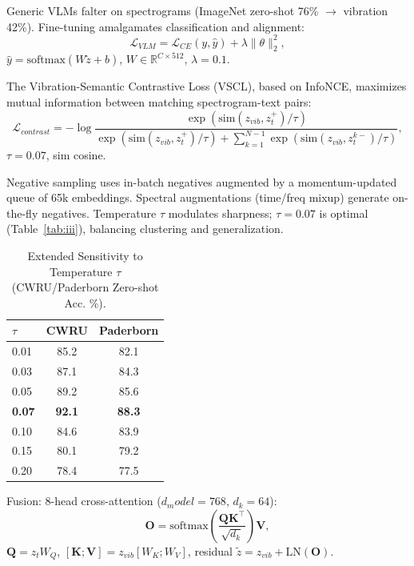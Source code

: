 Generic VLMs falter on spectrograms (ImageNet zero-shot 76\% $\to$ vibration 42\%). Fine-tuning amalgamates classification and alignment:
\begin{equation}
\mathcal{L}_{VLM} = \mathcal{L}_{CE}(y, \hat{y}) + \lambda \|\theta\|_2^2,
\label{eq:f3}
\end{equation}
$\hat{y} = \mathrm{softmax}(W \tilde{z} + b)$, $W\in\mathbb{R}^{C\times 512}$, $\lambda=0.1$.

The Vibration-Semantic Contrastive Loss (VSCL), based on InfoNCE, maximizes mutual information between matching spectrogram-text pairs:
\begin{equation}
\mathcal{L}_{contrast} = -\log \frac{\exp(\mathrm{sim}(z_{vib}, z_t^+)/\tau)}{\exp(\mathrm{sim}(z_{vib}, z_t^+)/\tau) + \sum_{k=1}^{N-1} \exp(\mathrm{sim}(z_{vib}, z_t^{k-})/\tau)},
\label{eq:f4}
\end{equation}
$\tau=0.07$, sim cosine. 

Negative sampling uses in-batch negatives augmented by a momentum-updated queue of 65k embeddings. Spectral augmentations (time/freq mixup) generate on-the-fly negatives. Temperature $\tau$ modulates sharpness; $\tau=0.07$ is optimal (Table~\ref{tab:iii}), balancing clustering and generalization.

\begin{table}[t]
\centering
\caption{Extended Sensitivity to Temperature $\tau$ (CWRU/Paderborn Zero-shot Acc. \%).}
\label{tab:tau_extended}
\begin{tabular}{@{}lcc@{}}
\toprule
$\tau$ & CWRU & Paderborn \\
\midrule
0.01 & 85.2 & 82.1 \\
0.03 & 87.1 & 84.3 \\
0.05 & 89.2 & 85.6 \\
\textbf{0.07} & \textbf{92.1} & \textbf{88.3} \\
0.10 & 84.6 & 83.9 \\
0.15 & 80.1 & 79.2 \\
0.20 & 78.4 & 77.5 \\
\bottomrule
\end{tabular}
\end{table}

Fusion: 8-head cross-attention ($d_model=768$, $d_k=64$):
\begin{equation}
\mathbf{O} = \mathrm{softmax}\left( \frac{\mathbf{Q} \mathbf{K}^\top}{\sqrt{d_k}} \right) \mathbf{V},
\label{eq:f5}
\end{equation}
$\mathbf{Q} = z_t W_Q$, $[\mathbf{K}; \mathbf{V}] = z_{vib} [W_K; W_V]$, residual $\tilde{z} = z_{vib} + \mathrm{LN}(\mathbf{O})$.

